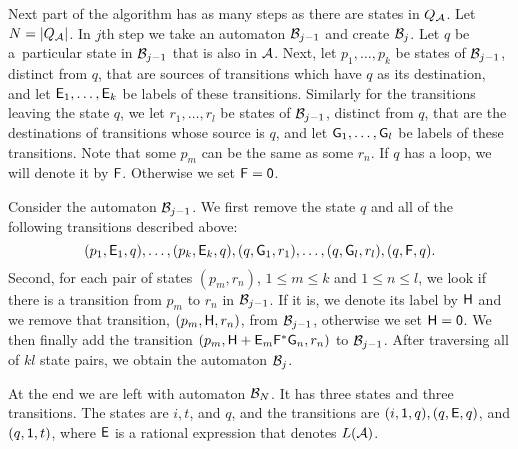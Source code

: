 Next part of the algorithm has as many steps as there are states in $Q_{{\mathcal{A}}}$. Let $N = |Q_{{\mathcal{A}}}|$. In $j$th step we take an automaton ${\mathcal{B}}_{j-1}$ and create ${\mathcal{B}}_j$. Let $q$ be a~particular state in ${\mathcal{B}}_{j-1}$ that is also in ${\mathcal{A}}$. Next, let $p_1, \dotsc , p_k$ be states of ${\mathcal{B}}_{j-1}$, distinct from $q$, that are sources of transitions which have $q$ as its destination, and let ${\mathsf{E}}_1, \dotsc , {\mathsf{E}}_k$ be labels of these transitions. Similarly for the transitions leaving the state $q$, we let $r_1, \dotsc , r_l$ be states of ${\mathcal{B}}_{j-1}$, distinct from $q$, that are the destinations of transitions whose source is $q$, and let ${\mathsf{G}}_1, \dotsc , {\mathsf{G}}_l$ be labels of these transitions. Note that some $p_m$ can be the same as some $r_n$. If $q$ has a loop, we will denote it by ${\mathsf{F}}$. Otherwise we set ${\mathsf{F}} = {\mathsf{0}}$.

Consider the automaton ${\mathcal{B}}_{j-1}$. We first remove the state $q$ and all of the following transitions described above:
\[
    (p_1, {\mathsf{E}}_1, q), \dotsc, (p_k, {\mathsf{E}}_k, q), (q, {\mathsf{G}}_1, r_1), \dotsc, (q, {\mathsf{G}}_l, r_l), (q, {\mathsf{F}}, q).
\]
Second, for each pair of states $(p_m, r_n)$, $1 \leq m \leq k$ and $1 \leq n \leq l$, we look if there is a transition from $p_m$ to $r_n$ in ${\mathcal{B}}_{j-1}$. If it is, we denote its label by ${\mathsf{H}}$ and we remove that transition, $(p_m, {\mathsf{H}}, r_n)$, from ${\mathcal{B}}_{j-1}$, otherwise we set ${\mathsf{H}} = {\mathsf{0}}$. We then finally add the transition $(p_m, {\mathsf{H}} + {\mathsf{E}}_m {\mathsf{F}}^* {\mathsf{G}}_n, r_n)$ to ${\mathcal{B}}_{j-1}$. After traversing all of $k l$ state pairs, we obtain the automaton ${\mathcal{B}}_j$.

At the end we are left with automaton ${\mathcal{B}}_N$. It has three states and three transitions. The states are $i, t$, and $q$, and the transitions are $(i, {\mathsf{1}}, q), (q, {\mathsf{E}}, q)$, and $(q, {\mathsf{1}}, t)$, where ${\mathsf{E}}$ is a rational expression that denotes $L({\mathcal{A}})$.